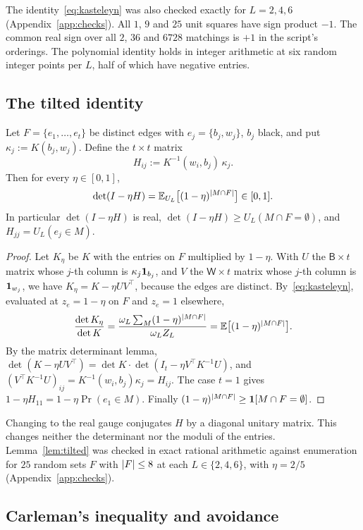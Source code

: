 The identity~\eqref{eq:kasteleyn} was also checked exactly for $L=2,4,6$ (Appendix~\ref{app:checks}). All $1$, $9$ and $25$ unit squares have sign product $-1$. The common real sign over all $2$, $36$ and $6728$ matchings is $+1$ in the script's orderings. The polynomial identity holds in integer arithmetic at six random integer points per $L$, half of which have negative entries.

\subsection{The tilted identity}

\begin{lemma}\label{lem:tilted}
Let $F=\{e_1,\dots,e_t\}$ be distinct edges with $e_j=\{b_j,w_j\}$, $b_j$ black, and put $\kappa_j:=K(b_j,w_j)$. Define the $t\times t$ matrix
\[
  H_{ij}:=K^{-1}(w_i,b_j)\,\kappa_j .
\]
Then for every $\eta\in[0,1]$,
\[
  \det(I-\eta H)=\mathbb{E}_{U_L}\bigl[(1-\eta)^{\lvert M\cap F\rvert}\bigr]\in[0,1].
\]
In particular $\det(I-\eta H)$ is real, $\det(I-\eta H)\ge U_L(M\cap F=\emptyset)$, and $H_{jj}=U_L(e_j\in M)$.
\end{lemma}

\begin{proof}
Let $K_\eta$ be $K$ with the entries on $F$ multiplied by $1-\eta$. With $U$ the $\mathsf B\times t$ matrix whose $j$-th column is $\kappa_j\mathbf{1}_{b_j}$, and $V$ the $\mathsf W\times t$ matrix whose $j$-th column is $\mathbf{1}_{w_j}$, we have $K_\eta=K-\eta UV^{\top}$, because the edges are distinct. By~\eqref{eq:kasteleyn}, evaluated at $z_e=1-\eta$ on $F$ and $z_e=1$ elsewhere,
\[
  \frac{\det K_\eta}{\det K}=\frac{\omega_L\sum_M(1-\eta)^{\lvert M\cap F\rvert}}{\omega_LZ_L}=\mathbb{E}\bigl[(1-\eta)^{\lvert M\cap F\rvert}\bigr].
\]
By the matrix determinant lemma, $\det(K-\eta UV^{\top})=\det K\cdot\det(I_t-\eta V^{\top}K^{-1}U)$, and $(V^{\top}K^{-1}U)_{ij}=K^{-1}(w_i,b_j)\kappa_j=H_{ij}$. The case $t=1$ gives $1-\eta H_{11}=1-\eta\Pr(e_1\in M)$. Finally $(1-\eta)^{\lvert M\cap F\rvert}\ge\mathbf{1}[M\cap F=\emptyset]$.
\end{proof}

Changing to the real gauge conjugates $H$ by a diagonal unitary matrix. This changes neither the determinant nor the moduli of the entries. Lemma~\ref{lem:tilted} was checked in exact rational arithmetic against enumeration for $25$ random sets $F$ with $\lvert F\rvert\le8$ at each $L\in\{2,4,6\}$, with $\eta=2/5$ (Appendix~\ref{app:checks}).

\subsection{Carleman's inequality and avoidance}


